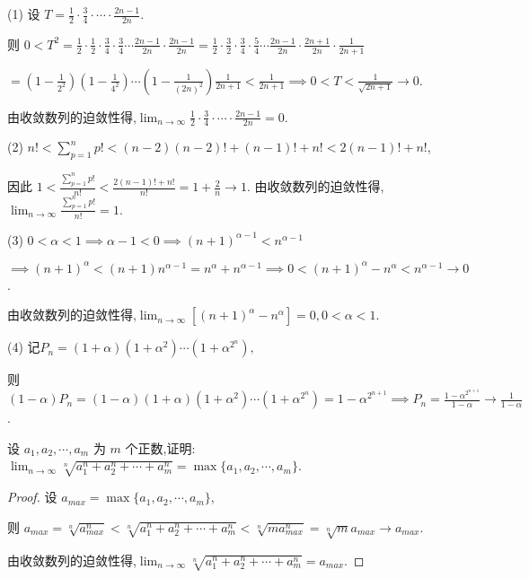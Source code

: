 \begin{solve}
    (1) 设 $T=\frac{1}{2}\cdot\frac{3}{4}\cdot \cdots \cdot \frac{2n-1}{2n}$. 
    
    则 $0<T^2=\frac{1}{2}\cdot \frac{1}{2}\cdot\frac{3}{4}\cdot \frac{3}{4} \cdots \frac{2n-1}{2n} \cdot \frac{2n-1}{2n}=\frac{1}{2}\cdot \frac{3}{2}\cdot\frac{3}{4}\cdot \frac{5}{4} \cdots \frac{2n-1}{2n} \cdot \frac{2n+1}{2n} \cdot \frac{1}{2n+1}$

    $=(1-\frac{1}{2^2})(1-\frac{1}{4^2})\cdots(1-\frac{1}{(2n)^2})\frac{1}{2n+1}<\frac{1}{2n+1}\implies 0<T<\frac{1}{\sqrt{2n+1}}\to 0$. 

    由收敛数列的迫敛性得,$\lim_{n\to\infty} \frac{1}{2}\cdot\frac{3}{4}\cdot \cdots \cdot \frac{2n-1}{2n}=0$.

    (2) $n!<\sum\limits_{p=1}^{n}p!<(n-2)(n-2)!+(n-1)!+n!<2(n-1)!+n!$,
    
    因此 $1<\frac{\sum\limits_{p=1}^{n}p!}{n!}<\frac{2(n-1)!+n!}{n!}=1+\frac{2}{n} \to 1$. 由收敛数列的迫敛性得,$\lim_{n\to\infty} \frac{\sum\limits_{p=1}^{n}p!}{n!}=1$.

    (3) $0<\alpha<1\implies \alpha-1<0 \implies (n+1)^{\alpha-1}<n^{\alpha-1}$
    
    $\implies (n+1)^{\alpha}<(n+1)n^{\alpha-1}=n^{\alpha}+n^{\alpha-1}\implies 0<(n+1)^{\alpha}-n^{\alpha}<n^{\alpha-1}\to 0$.

    由收敛数列的迫敛性得,$\lim_{n\to\infty} [(n+1)^\alpha-n^\alpha]=0,0<\alpha<1$.

    (4) 记$P_n=(1+\alpha)(1+\alpha^2)\cdots(1+\alpha^{2^n}),$ 
    
    则$(1-\alpha)P_n=(1-\alpha)(1+\alpha)(1+\alpha^2)\cdots(1+\alpha^{2^n})=1-\alpha^{2^{n+1}}\implies P_n=\frac{1-\alpha^{2^{n+1}}}{1-\alpha}\to \frac{1}{1-\alpha}$.
\end{solve}

\begin{practice}
    设 $a_1,a_2,\cdots,a_m$ 为 $m$ 个正数,证明:
    $\lim_{n\to\infty} \sqrt[n]{a_1^n+a_2^n+\cdots+a_m^n}=\max \{a_1,a_2,\cdots,a_m\}$. 
\end{practice}

\begin{proof}
    设 $a_{max}=\max \{a_1,a_2,\cdots,a_m\}$,
    
    则 $a_{max}=\sqrt[n]{a_{max}^n}<\sqrt[n]{a_1^n+a_2^n+\cdots+a_m^n}<\sqrt[n]{ma_{max}^n}=\sqrt[n]{m}a_{max}\to a_{max}$.

    由收敛数列的迫敛性得,$\lim_{n\to\infty} \sqrt[n]{a_1^n+a_2^n+\cdots+a_m^n}=a_{max}$. 
\end{proof}

